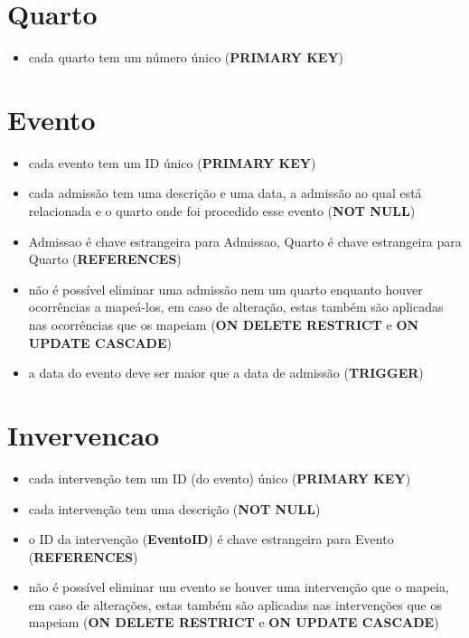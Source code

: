 \documentclass[article, a4paper, 12pt, oneside]{memoir}
\begin{document}
\section*{Quarto}
\begin{itemize}
	\item cada quarto tem um número único (\textbf{PRIMARY KEY})
\end{itemize}

\section*{Evento}
\begin{itemize}
	\item cada evento tem um ID único (\textbf{PRIMARY KEY})
	\item cada admissão tem uma descrição e uma data, a admissão ao qual está relacionada e o quarto onde foi procedido esse evento (\textbf{NOT NULL})
	\item Admissao é chave estrangeira para Admissao, Quarto é chave estrangeira para Quarto (\textbf{REFERENCES})
	\item não é possível eliminar uma admissão nem um quarto enquanto houver ocorrências a mapeá-los, em caso de alteração, estas também são aplicadas nas ocorrências que os mapeiam (\textbf{ON DELETE RESTRICT} e \textbf{ON UPDATE CASCADE})
	\item a data do evento deve ser maior que a data de admissão (\textbf{TRIGGER})
\end{itemize}

\section*{Invervencao}
\begin{itemize}
	\item cada intervenção tem um ID (do evento) único (\textbf{PRIMARY KEY})
	\item cada intervenção tem uma descrição (\textbf{NOT NULL})
	\item o ID da intervenção (\textbf{EventoID}) é chave estrangeira para Evento (\textbf{REFERENCES})
	\item não é possível eliminar um evento se houver uma intervenção que o mapeia, em caso de alterações, estas também são aplicadas nas intervenções que os mapeiam (\textbf{ON DELETE RESTRICT} e \textbf{ON UPDATE CASCADE})
\end{itemize}
\end{document}
